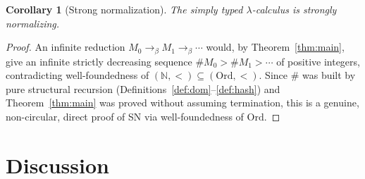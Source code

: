\documentclass{amsart}
\newtheorem{corollary}{Corollary}
\theoremstyle{definition}
\newcommand{\Ord}{\mathrm{Ord}}
\newcommand{\To}{\to_\beta}
\begin{document}
\begin{corollary}[Strong normalization]\label{cor:SN}
The simply typed $\lambda$-calculus is strongly normalizing.
\end{corollary}

\begin{proof}
An infinite reduction $M_0\To M_1\To\cdots$ would, by Theorem~\ref{thm:main}, give an
infinite strictly decreasing sequence $\#M_0>\#M_1>\cdots$ of positive integers,
contradicting well-foundedness of $(\mathbb N,<)\subseteq(\Ord,<)$. Since $\#$ was built by
pure structural recursion (Definitions~\ref{def:dom}--\ref{def:hash}) and
Theorem~\ref{thm:main} was proved without assuming termination, this is a genuine,
non-circular, direct proof of SN via well-foundedness of $\Ord$.
\end{proof}

\section*{Discussion}
\end{document}
